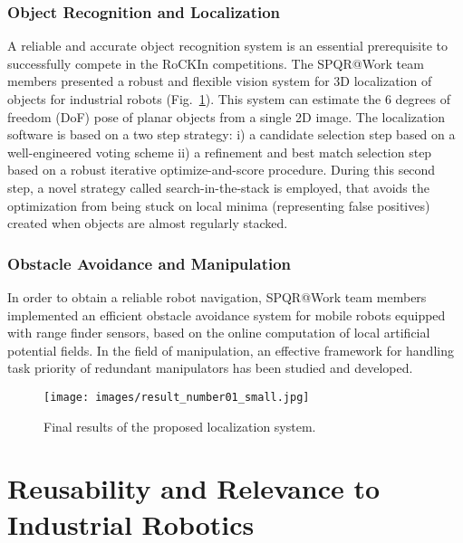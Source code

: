 \documentclass[conference]{IEEEtran}
\begin{document}
\subsubsection{Object Recognition and Localization}\label{sec:object_rec}
A reliable and accurate object recognition system is an essential prerequisite to successfully compete in the RoCKIn competitions. The SPQR@Work team members presented a robust and flexible vision system for 3D localization of objects for industrial robots \cite{prettoCASE2013} (Fig.~\ref{fig:obj_rec}). This system can estimate the 6 degrees of freedom (DoF) pose of planar objects from a single 2D image.
The localization software is based on a two step strategy: i) a candidate selection step based on a well-engineered voting scheme ii) a refinement and best match selection step based on a robust iterative optimize-and-score procedure. During this second step, a novel strategy called search-in-the-stack is employed, that avoids the optimization from being stuck on local minima (representing false positives) created when objects are almost regularly stacked.

\subsubsection{Obstacle Avoidance and Manipulation}\label{sec:manipulation}
In order to obtain a reliable robot navigation, SPQR@Work team members implemented an efficient obstacle avoidance system for mobile robots equipped with range finder sensors, based on the online computation of local artificial potential fields. \newline In the field of manipulation, an effective framework for handling task priority of redundant manipulators has been studied and developed.
\begin{figure}[t!]
\begin{center}
\texttt{[image: images/result\_number01\_small.jpg]}
\end{center}
\caption{Final results of the proposed localization system.}\label{fig:obj_rec}
\end{figure}

\section{Reusability and Relevance to Industrial Robotics}
\end{document}
